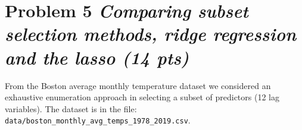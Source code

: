 \documentclass[11pt,twoside]{article}
\newcommand{\pts}[1]{\marginpar{ \small\hspace{0pt} \textit{[#1]} } }
\newcommand{\lt}{\left}
\newcommand{\rt}{\right}
\newcommand{\?}{\stackrel{?}{=}}
\newcommand{\la}{\lambda}
\begin{document}
\begin{enumerate}[\bf (a)]
  
\end{enumerate}


\section*{Problem 5 \quad
  {\it Comparing subset selection methods, ridge regression and the lasso (14 pts)}}
From the Boston average monthly temperature dataset 
we considered an exhaustive enumeration approach in selecting a subset of predictors (12 lag variables).
The dataset is in the file: \texttt{data/boston\_monthly\_avg\_temps\_1978\_2019.csv}.
\end{document}
